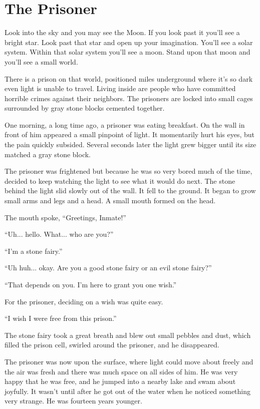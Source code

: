 \chapter{The Prisoner}

Look into the sky and you may see the Moon. If you look past it you'll see a bright star. Look past that star and open up your imagination. You'll see a solar system. Within that solar system you'll see a moon. Stand upon that moon and you'll see a small world.

There is a prison on that world, positioned miles underground where it's so dark even light is unable to travel. Living inside are people who have committed horrible crimes against their neighbors. The prisoners are locked into small cages surrounded by gray stone blocks cemented together.

One morning, a long time ago, a prisoner was eating breakfast. On the wall in front of him appeared a small pinpoint of light. It momentarily hurt his eyes, but the pain quickly subsided. Several seconds later the light grew bigger until its size matched a gray stone block.

The prisoner was frightened but because he was so very bored much of the time, decided to keep watching the light to see what it would do next. The stone behind the light slid slowly out of the wall. It fell to the ground. It began to grow small arms and legs and a head. A small mouth formed on the head.

The mouth spoke, “Greetings, Inmate!”

“Uh... hello. What... who are you?”

“I'm a stone fairy.”

“Uh huh... okay. Are you a good stone fairy or an evil stone fairy?”

“That depends on you. I'm here to grant you one wish.”

For the prisoner, deciding on a wish was quite easy.

“I wish I were free from this prison.”

The stone fairy took a great breath and blew out small pebbles and dust, which filled the prison cell, swirled around the prisoner, and he disappeared.

The prisoner was now upon the surface, where light could move about freely and the air was fresh and there was much space on all sides of him. He was very happy that he was free, and he jumped into a nearby lake and swam about joyfully. It wasn't until after he got out of the water when he noticed something very strange. He was fourteen years younger.

